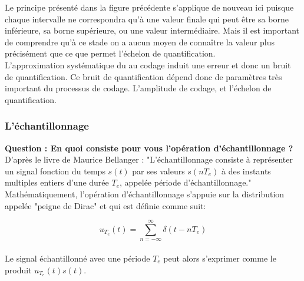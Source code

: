\documentclass[11pt,a4paper]{article}
\begin{document}
Le principe présenté dans la figure précédente s'applique de nouveau ici puisque chaque intervalle ne correspondra qu'à une valeur finale qui peut être sa borne inférieure, sa borne supérieure, ou une valeur intermédiaire. Mais il est important de comprendre qu'à ce stade on a aucun moyen de connaître la valeur plus précisément que ce que permet l'échelon de quantification.\\


L'approximation systématique du au codage induit une erreur et donc un bruit de quantification. Ce bruit de quantification dépend donc de paramètres très important du processus de codage. L'amplitude de codage, et l'échelon de quantification.\\

\subsubsection{L'échantillonnage}

\textbf{Question : En quoi consiste pour vous l'opération d'échantillonnage ?}\\

D'après le livre de Maurice Bellanger : "L’échantillonnage consiste à représenter un signal fonction du temps $s(t)$ par ses
valeurs $s(nT_e)$ à des instants multiples entiers d’une durée $T_e$, appelée période d’échantillonnage."\\

Mathématiquement, l'opération d'échantillonnage s'appuie sur la distribution appelée "peigne de Dirac" et qui est définie comme suit: 

\[ u_{T_e}(t) = \sum_{n = -\infty}^{\infty} \delta(t-nT_e) \]\\

Le signal échantillonné avec une période $T_e$ peut alors s'exprimer comme le produit $u_{T_e}(t) s(t)$.\\

\begin{center}
\end{center}
\end{document}
